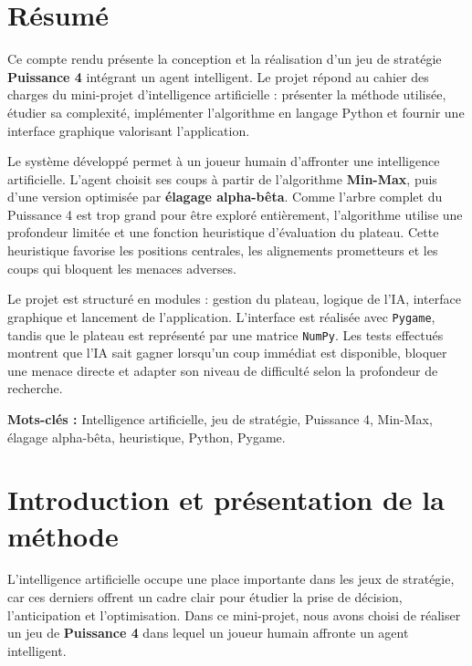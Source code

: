 \documentclass[12pt,a4paper]{article}
\newcommand{\keyword}[1]{\textbf{\textcolor{projectnavy}{#1}}}
\begin{document}
\section*{Résumé}

Ce compte rendu présente la conception et la réalisation d'un jeu de stratégie \keyword{Puissance 4} intégrant un agent intelligent. Le projet répond au cahier des charges du mini-projet d'intelligence artificielle : présenter la méthode utilisée, étudier sa complexité, implémenter l'algorithme en langage Python et fournir une interface graphique valorisant l'application.

Le système développé permet à un joueur humain d'affronter une intelligence artificielle. L'agent choisit ses coups à partir de l'algorithme \keyword{Min-Max}, puis d'une version optimisée par \keyword{élagage alpha-bêta}. Comme l'arbre complet du Puissance 4 est trop grand pour être exploré entièrement, l'algorithme utilise une profondeur limitée et une fonction heuristique d'évaluation du plateau. Cette heuristique favorise les positions centrales, les alignements prometteurs et les coups qui bloquent les menaces adverses.

Le projet est structuré en modules : gestion du plateau, logique de l'IA, interface graphique et lancement de l'application. L'interface est réalisée avec \texttt{Pygame}, tandis que le plateau est représenté par une matrice \texttt{NumPy}. Les tests effectués montrent que l'IA sait gagner lorsqu'un coup immédiat est disponible, bloquer une menace directe et adapter son niveau de difficulté selon la profondeur de recherche.

\vspace{0.4cm}
\noindent\textbf{Mots-clés :} Intelligence artificielle, jeu de stratégie, Puissance 4, Min-Max, élagage alpha-bêta, heuristique, Python, Pygame.

\newpage
\tableofcontents
\newpage
{}

\section{Introduction et présentation de la méthode}

L'intelligence artificielle occupe une place importante dans les jeux de stratégie, car ces derniers offrent un cadre clair pour étudier la prise de décision, l'anticipation et l'optimisation. Dans ce mini-projet, nous avons choisi de réaliser un jeu de \keyword{Puissance 4} dans lequel un joueur humain affronte un agent intelligent.
\end{document}
